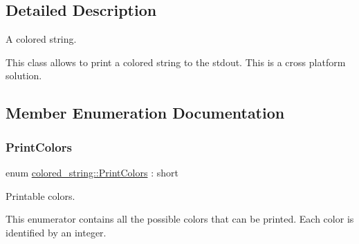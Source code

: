 \subsection{Detailed Description}
A colored string. 

This class allows to print a colored string to the stdout. This is a cross platform solution. 

\subsection{Member Enumeration Documentation}
\mbox{\label{classcolored__string_a76416a7db18c947e5a6d5bf17c78e497}} 
\subsubsection{\texorpdfstring{PrintColors}{PrintColors}}
{\footnotesize\ttfamily enum \mbox{\hyperlink{classcolored__string_a76416a7db18c947e5a6d5bf17c78e497}{colored\+\_\+string\+::\+Print\+Colors}} \+: short\hspace{0.3cm}{\ttfamily [strong]}}



Printable colors. 

This enumerator contains all the possible colors that can be printed. Each color is identified by an integer.

